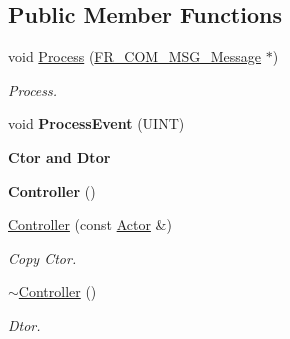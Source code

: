 \subsection*{Public Member Functions}
\begin{DoxyCompactItemize}
\item 
\hypertarget{classContent_1_1Actor_1_1Admin_1_1Controller_a10ef1f696b0ca66c98b3156d4e78b933}{
void \hyperlink{classContent_1_1Actor_1_1Admin_1_1Controller_a10ef1f696b0ca66c98b3156d4e78b933}{Process} (\hyperlink{structFramework_1_1Communication_1_1Message_1_1Message}{FR\_\-COM\_\-MSG\_\-Message} $\ast$)}
\label{classContent_1_1Actor_1_1Admin_1_1Controller_a10ef1f696b0ca66c98b3156d4e78b933}

\begin{DoxyCompactList}\small\item\em Process. \item\end{DoxyCompactList}\item 
\hypertarget{classContent_1_1Actor_1_1Admin_1_1Controller_a4ce7df4222c8758fef9b4ff8167647e2}{
void {\bfseries ProcessEvent} (UINT)}
\label{classContent_1_1Actor_1_1Admin_1_1Controller_a4ce7df4222c8758fef9b4ff8167647e2}

\end{DoxyCompactItemize}
\begin{Indent}{\bf Ctor and Dtor}\par
{\em \label{_amgrpad04e46909a047f9938f8e1fa1abe24a}
 }\begin{DoxyCompactItemize}
\item 
\hypertarget{classContent_1_1Actor_1_1Admin_1_1Controller_a70faf6cf480fdb287ce1f11067b1fcce}{
{\bfseries Controller} ()}
\label{classContent_1_1Actor_1_1Admin_1_1Controller_a70faf6cf480fdb287ce1f11067b1fcce}

\item 
\hypertarget{classContent_1_1Actor_1_1Admin_1_1Controller_ac846fd9dac928e03ff540dc53f159599}{
\hyperlink{classContent_1_1Actor_1_1Admin_1_1Controller_ac846fd9dac928e03ff540dc53f159599}{Controller} (const \hyperlink{classContent_1_1Actor_1_1Admin_1_1Actor}{Actor} \&)}
\label{classContent_1_1Actor_1_1Admin_1_1Controller_ac846fd9dac928e03ff540dc53f159599}

\begin{DoxyCompactList}\small\item\em Copy Ctor. \item\end{DoxyCompactList}\item 
\hypertarget{classContent_1_1Actor_1_1Admin_1_1Controller_a2d5dd93846e82c450cb675dc281c6904}{
\hyperlink{classContent_1_1Actor_1_1Admin_1_1Controller_a2d5dd93846e82c450cb675dc281c6904}{$\sim$Controller} ()}
\label{classContent_1_1Actor_1_1Admin_1_1Controller_a2d5dd93846e82c450cb675dc281c6904}

\begin{DoxyCompactList}\small\item\em Dtor. \item\end{DoxyCompactList}\end{DoxyCompactItemize}
\end{Indent}

